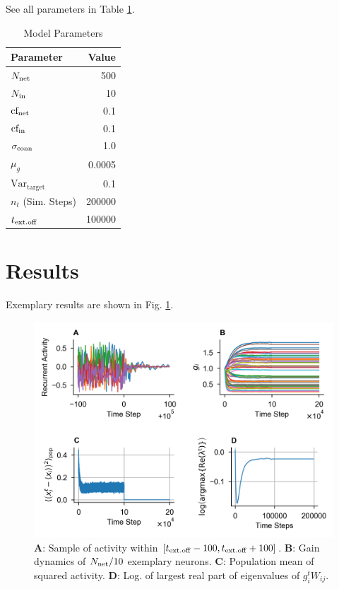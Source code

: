 \documentclass[10pt,a4paper]{article}
\begin{document}
See all parameters in Table \ref{tab:params}.
\begin{table}[h]
\caption{Model Parameters}
\centering
\vspace{5pt}
\begin{tabular}{l | r}
\textbf{Parameter} & \textbf{Value} \\
\hline
$N_{\rm net}$           & 500\\
$N_{\rm in}$            & 10\\
${\rm cf_{net}}$        & 0.1\\
${\rm cf_{in}}$         & 0.1\\
$\sigma_{\rm conn}$     & 1.0\\
$\mu_{g}$               & 0.0005\\
$\mathrm{Var_{target}}$ & 0.1\\
$n_t$ (Sim. Steps)      & 200000\\
$t_{\rm ext.off}$       & 100000
\end{tabular}
\label{tab:params}
\end{table}
\newpage
\section{Results}
Exemplary results are shown in Fig. \ref{fig:ex_results}.

\begin{figure}[h]
\includegraphics[width=\textwidth]{../plots/im_comp.png}
\caption{{\bf A}: Sample of activity within $\left[ t_{\rm ext.off} - 100, t_{\rm ext.off} + 100 \right]$. {\bf B}: Gain dynamics of $N_{\rm net}/10$ exemplary neurons. {\bf C}: Population mean of squared activity. {\bf D}: Log. of largest real part of eigenvalues of $g_i^t W_{ij} $.}
\label{fig:ex_results}
\end{figure}
\end{document}
